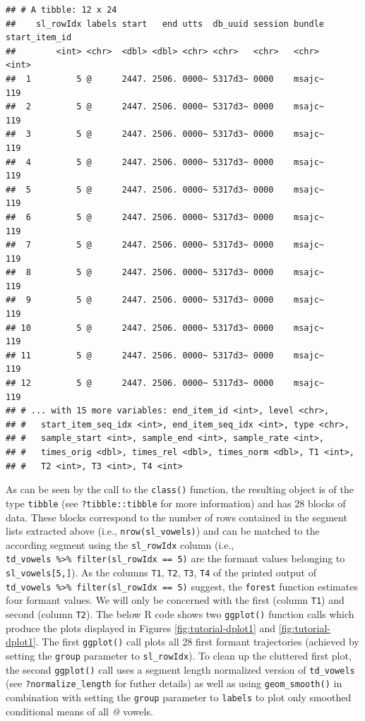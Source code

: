 \documentclass[]{book}
\theoremstyle{definition}
\theoremstyle{definition}
\theoremstyle{definition}
\theoremstyle{remark}
\begin{document}
\begin{verbatim}
## # A tibble: 12 x 24
##    sl_rowIdx labels start   end utts  db_uuid session bundle start_item_id
##        <int> <chr>  <dbl> <dbl> <chr> <chr>   <chr>   <chr>          <int>
##  1         5 @      2447. 2506. 0000~ 5317d3~ 0000    msajc~           119
##  2         5 @      2447. 2506. 0000~ 5317d3~ 0000    msajc~           119
##  3         5 @      2447. 2506. 0000~ 5317d3~ 0000    msajc~           119
##  4         5 @      2447. 2506. 0000~ 5317d3~ 0000    msajc~           119
##  5         5 @      2447. 2506. 0000~ 5317d3~ 0000    msajc~           119
##  6         5 @      2447. 2506. 0000~ 5317d3~ 0000    msajc~           119
##  7         5 @      2447. 2506. 0000~ 5317d3~ 0000    msajc~           119
##  8         5 @      2447. 2506. 0000~ 5317d3~ 0000    msajc~           119
##  9         5 @      2447. 2506. 0000~ 5317d3~ 0000    msajc~           119
## 10         5 @      2447. 2506. 0000~ 5317d3~ 0000    msajc~           119
## 11         5 @      2447. 2506. 0000~ 5317d3~ 0000    msajc~           119
## 12         5 @      2447. 2506. 0000~ 5317d3~ 0000    msajc~           119
## # ... with 15 more variables: end_item_id <int>, level <chr>,
## #   start_item_seq_idx <int>, end_item_seq_idx <int>, type <chr>,
## #   sample_start <int>, sample_end <int>, sample_rate <int>,
## #   times_orig <dbl>, times_rel <dbl>, times_norm <dbl>, T1 <int>,
## #   T2 <int>, T3 <int>, T4 <int>
\end{verbatim}

As can be seen by the call to the \texttt{class()} function, the
resulting object is of the type \texttt{tibble} (see
\texttt{?tibble::tibble} for more information) and has 28 blocks of
data. These blocks correspond to the number of rows contained in the
segment lists extracted above (i.e., \texttt{nrow(sl\_vowels)}) and can
be matched to the according segment using the \texttt{sl\_rowIdx} column
(i.e.,
\texttt{td\_vowels\ \%\textgreater{}\%\ filter(sl\_rowIdx\ ==\ 5)} are
the formant values belonging to \texttt{sl\_vowels{[}5,{]}}). As the
columns \texttt{T1}, \texttt{T2}, \texttt{T3}, \texttt{T4} of the
printed output of
\texttt{td\_vowels\ \%\textgreater{}\%\ filter(sl\_rowIdx\ ==\ 5)}
suggest, the \texttt{forest} function estimates four formant values. We
will only be concerned with the first (column \texttt{T1}) and second
(column \texttt{T2}). The below R code shows two \texttt{ggplot()}
function calls which produce the plots displayed in Figures
\ref{fig:tutorial-dplot1} and \ref{fig:tutorial-dplot1}. The first
\texttt{ggplot()} call plots all 28 first formant trajectories (achieved
by setting the \texttt{group} parameter to \texttt{sl\_rowIdx}). To
clean up the cluttered first plot, the second \texttt{ggplot()} call
uses a segment length normalized version of \texttt{td\_vowels} (see
\texttt{?normalize\_length} for futher details) as well as using
\texttt{geom\_smooth()} in combination with setting the \texttt{group}
parameter to \texttt{labels} to plot only smoothed conditional means of
all \emph{@} vowels.
\end{document}
